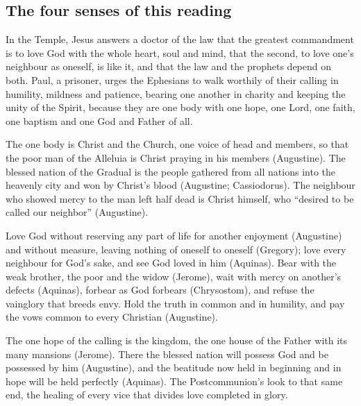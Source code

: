 \subsection{The four senses of this reading}

\begin{fourSenses}
\item[Literal.] In the Temple, Jesus answers a doctor of the law that the
greatest commandment is to love God with the whole heart, soul and mind, that
the second, to love one's neighbour as oneself, is like it, and that the law
and the prophets depend on both. Paul, a prisoner, urges the Ephesians to
walk worthily of their calling in humility, mildness and patience, bearing
one another in charity and keeping the unity of the Spirit, because they are
one body with one hope, one Lord, one faith, one baptism and one God and
Father of all.

\item[Allegorical.] The one body is Christ and the Church, one voice of head
and members, so that the poor man of the Alleluia is Christ praying in his
members (Augustine). The blessed nation of the Gradual is the people gathered
from all nations into the heavenly city and won by Christ's blood
(Augustine; Cassiodorus). The neighbour who showed mercy to the man left half
dead is Christ himself, who ``desired to be called our neighbor'' (Augustine).

\item[Moral.] Love God without reserving any part of life for another
enjoyment (Augustine) and without measure, leaving nothing of oneself to
oneself (Gregory); love every neighbour for God's sake, and see God loved in
him (Aquinas). Bear with the weak brother, the poor and the widow (Jerome),
wait with mercy on another's defects (Aquinas), forbear as God forbears
(Chrysostom), and refuse the vainglory that breeds envy. Hold the truth in
common and in humility, and pay the vows common to every Christian
(Augustine).

\item[Anagogical.] The one hope of the calling is the kingdom, the one house
of the Father with its many mansions (Jerome). There the blessed nation will
possess God and be possessed by him (Augustine), and the beatitude now held
in beginning and in hope will be held perfectly (Aquinas). The
Postcommunion's  look to that same end, the healing
of every vice that divides love completed in glory.
\end{fourSenses}
